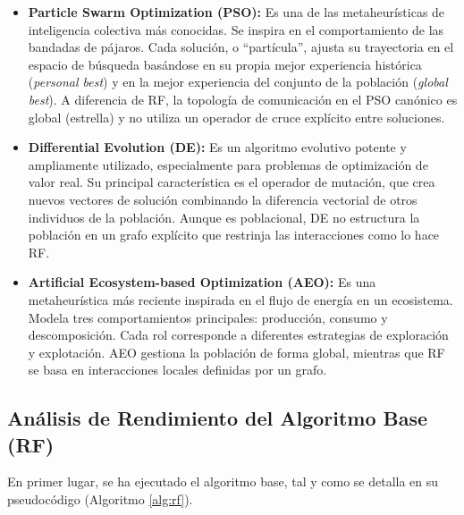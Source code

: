 \documentclass[11pt,a4paper]{article}
\begin{document}
\begin{itemize}
    \item \textbf{Particle Swarm Optimization (PSO):} Es una de las metaheurísticas 
    de inteligencia colectiva más conocidas. Se inspira en el comportamiento de las 
    bandadas de pájaros. Cada solución, o ``partícula'', ajusta su trayectoria en el 
    espacio de búsqueda basándose en su propia mejor experiencia histórica (\textit{personal best}) 
    y en la mejor experiencia del conjunto de la población (\textit{global best}). 
    A diferencia de RF, la topología de comunicación en el PSO canónico es global 
    (estrella) y no utiliza un operador de cruce explícito entre soluciones.
    
    \item \textbf{Differential Evolution (DE):} Es un algoritmo evolutivo potente y 
    ampliamente utilizado, especialmente para problemas de optimización de valor real. 
    Su principal característica es el operador de mutación, que crea nuevos vectores de 
    solución combinando la diferencia vectorial de otros individuos de la población. 
    Aunque es poblacional, DE no estructura la población en un grafo explícito que 
    restrinja las interacciones como lo hace RF.
    
    \item \textbf{Artificial Ecosystem-based Optimization (AEO):} Es una metaheurística 
    más reciente inspirada en el flujo de energía en un ecosistema. Modela tres 
    comportamientos principales: producción, consumo y descomposición. Cada rol 
    corresponde a diferentes estrategias de exploración y explotación. AEO gestiona la 
    población de forma global, mientras que RF se basa en interacciones locales definidas por un grafo.
\end{itemize}

\subsection{Análisis de Rendimiento del Algoritmo Base (RF)}

En primer lugar, se ha ejecutado el algoritmo base, tal y como se detalla 
en su pseudocódigo (Algoritmo \ref{alg:rf}).
\end{document}
